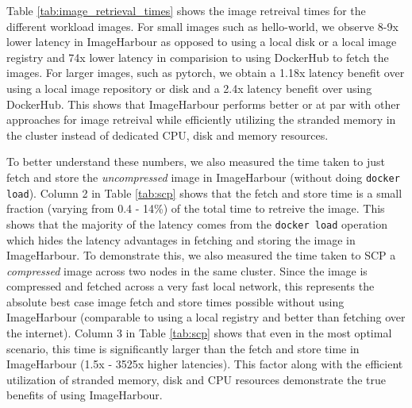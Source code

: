 \begin{table}[h]
    \centering
    \caption{Table showing the time to just fetch and store the uncompressed image in ImageHarbour (without doing \texttt{docker load}) and time to SCP the compressed image. The numbers in the bracket for fetch and store represent the percentage of the total time taken to fetch and store the image. The numbers in the bracket for SCP represent the latency slowdown factor as compared to fetch and store for ImageHarbour.}
    \label{tab:scp}
\end{table}


Table \ref{tab:image_retrieval_times} shows the image retreival times for the different workload images. For small images such as hello-world, we observe 8-9x lower latency in ImageHarbour as opposed to using a local disk or a local image registry and 74x lower latency in comparision to using DockerHub to fetch the images. For larger images, such as pytorch, we obtain a 1.18x latency benefit over using a local image repository or disk and a 2.4x latency benefit over using DockerHub. This shows that ImageHarbour performs better or at par with other approaches for image retreival while efficiently utilizing the stranded memory in the cluster instead of dedicated CPU, disk and memory resources.

To better understand these numbers, we also measured the time taken to just fetch and store the \textit{uncompressed} image in ImageHarbour (without doing \texttt{docker load}). Column 2 in Table \ref{tab:scp} shows that the fetch and store time is a small fraction (varying from 0.4 - 14\%) of the total time to retreive the image. This shows that the majority of the latency comes from the \texttt{docker load} operation which hides the latency advantages in fetching and storing the image in ImageHarbour. To demonstrate this, we also measured the time taken to SCP a \textit{compressed} image across two nodes in the same cluster. 
Since the image is compressed and fetched across a very fast local network, this represents the absolute best case image fetch and store times possible without using ImageHarbour (comparable to using a local registry and better than fetching over the internet). Column 3 in Table \ref{tab:scp} shows that even in the most optimal scenario, this time is significantly larger than the fetch and store time in ImageHarbour (1.5x - 3525x higher latencies). This factor along with the efficient utilization of stranded memory, disk and CPU resources demonstrate the true benefits of using ImageHarbour.  

